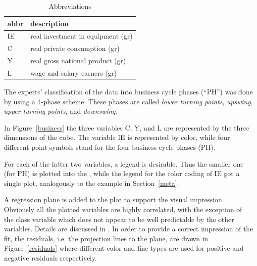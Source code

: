 \begin{table}[htb!]
 \centering \vspace{0.2cm}
 \begin{tabular}{|l|l|}   \hline
 abbr & description                     \\ \hline
 IE & real investment in equipment (gr) \\
 C  & real private consumption (gr)     \\
 Y  & real gross national product (gr)  \\
 L  & wage and salary earners (gr)      \\ \hline
 \end{tabular}
 \caption{Abbreviations\label{StyFacts}}
\end{table}

The experts' classification of the data into business cycle phases
(``PH'') was done by  using a 4-phase scheme.
These phases are called {\sl lower turning points}, {\sl upswing}, {\sl
  upper turning points}, and {\sl downswing}.

In Figure~\ref{business} the three variables C, Y, and L are represented by
the three dimensions of the cube.  The variable IE is represented by color,
while four different point symbols stand for the four business cycle phases
(PH).

For each of the latter two variables, a legend is desirable.
Thus the smaller one (for PH) is plotted into the \sdd , while the legend
for the color coding of IE got a single plot, analogously to the example in
Section~\ref{meta}.

A regression plane is added to the plot to support the visual impression.
Obviously all the plotted variables are highly correlated, with the
exception of the class variable which does not appear to be well
predictable by the other variables.  Details are discussed in
.
%
In order to provide a correct impression of the fit, the residuals,
i.e. the projection lines to the plane, are drawn in Figure~\ref{residuals}
where different color and line types are used for positive and negative
residuals respectively.

